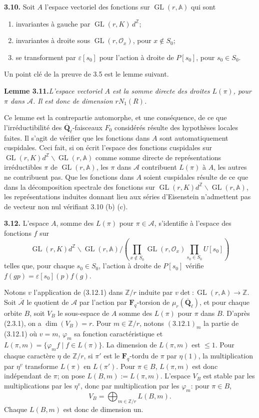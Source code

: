 \documentclass[11pt]{article}
\newcommand{\Fq}{\mathbf{F}_q}
\newcommand{\Qbl}{\overline{\mathbf{Q}}_{\ell}}
\newcommand{\GL}{\operatorname{GL}}
\newcommand{\Z}{\mathbb{Z}}
\newcommand{\Acal}{\mathcal{A}}
\newcommand{\Adele}{\mathbb{A}}
\newcommand{\para}[1]{\medskip\noindent\textbf{#1}\enspace}
\begin{document}
\para{3.10.} Soit \(A\) l'espace vectoriel des fonctions sur \(\GL(r,\Adele)\) qui sont
\begin{enumerate}[label=(\alph*),leftmargin=2.5em]
\item invariantes à gauche par \(\GL(r,K)\,d^{\Z}\);
\item invariantes à droite sous \(\GL(r,\mathcal O_x)\), pour \(x\notin S_0\);
\item se transforment par \(\varepsilon[s_0]\) pour l'action à droite de \(P[s_0]\), pour \(s_0\in S_0\).
\end{enumerate}
Un point clé de la preuve de 3.5 est le lemme suivant.

\noindent\textbf{Lemme 3.11.}\quad\textit{L'espace vectoriel \(A\) est la somme directe des droites \(L(\pi)\), pour \(\pi\) dans \(\Acal\). Il est donc de dimension \(rN_1(R)\).}

Ce lemme est la contrepartie automorphe, et une conséquence, de ce que l'irréductibilité des \(\Qbl\)-faisceaux \(F_0\) considérés résulte des hypothèses locales faites. Il s'agit de vérifier que les fonctions dans \(A\) sont automatiquement cuspidales. Ceci fait, si on écrit l'espace des fonctions cuspidales sur \(\GL(r,K)d^{\Z}\backslash\GL(r,\Adele)\) comme somme directe de représentations irréductibles \(\pi\) de \(\GL(r,\Adele)\), les \(\pi\) dans \(\Acal\) contribuent \(L(\pi)\) à \(A\), les autres ne contribuent pas. Que les fonctions dans \(A\) soient cuspidales résulte de ce que dans la décomposition spectrale des fonctions sur \(\GL(r,K)d^{\Z}\backslash\GL(r,\Adele)\), les représentations induites donnant lieu aux séries d'Eisenstein n'admettent pas de vecteur non nul vérifiant 3.10 (b) (c).

\para{3.12.} L'espace \(A\), somme des \(L(\pi)\) pour \(\pi\in\Acal\), s'identifie à l'espace des fonctions \(f\) sur
\begin{equation}
\GL(r,K)d^{\Z}\backslash\GL(r,\Adele)\Big/\left(\prod_{x\notin S_0}\GL(r,\mathcal O_x)\prod_{s_0\in S_0}U[s_0]\right)
\tag{3.12.1}
\end{equation}
telles que, pour chaque \(s_0\in S_0\), l'action à droite de \(P[s_0]\) vérifie \(f(gp)=\varepsilon[s_0](p)f(g)\).

Notons \(v\) l'application de (3.12.1) dans \(\Z/r\) induite par \(v\det:\GL(r,\Adele)\to\Z\). Soit \(\overline{\Acal}\) le quotient de \(\Acal\) par l'action par \(\Fq\)-torsion de \(\mu_r(\Qbl)\), et pour chaque orbite \(B\), soit \(V_B\) le sous-espace de \(A\) somme des \(L(\pi)\) pour \(\pi\) dans \(B\). D'après (2.3.1), on a \(\dim(V_B)=r\). Pour \(m\in\Z/r\), notons \((3.12.1)_m\) la partie de (3.12.1) où \(v=m\), \(\varphi_m\) sa fonction caractéristique et \(L(\pi,m)=\{\varphi_m f\mid f\in L(\pi)\}\). La dimension de \(L(\pi,m)\) est \(\leq1\). Pour chaque caractère \(\eta\) de \(\Z/r\), si \(\pi'\) est le \(\Fq\)-tordu de \(\pi\) par \(\eta(1)\), la multiplication par \(\eta^v\) transforme \(L(\pi)\) en \(L(\pi')\). Pour \(\pi\in B\), \(L(\pi,m)\) est donc indépendant de \(\pi\); on pose \(L(B,m):=L(\pi,m)\). L'espace \(V_B\) est stable par les multiplications par les \(\eta^v\), donc par multiplication par les \(\varphi_m\): pour \(\pi\in B\),
\[
  V_B=\bigoplus_{m\in\Z/r}L(B,m).
\]
Chaque \(L(B,m)\) est donc de dimension un.
\end{document}

